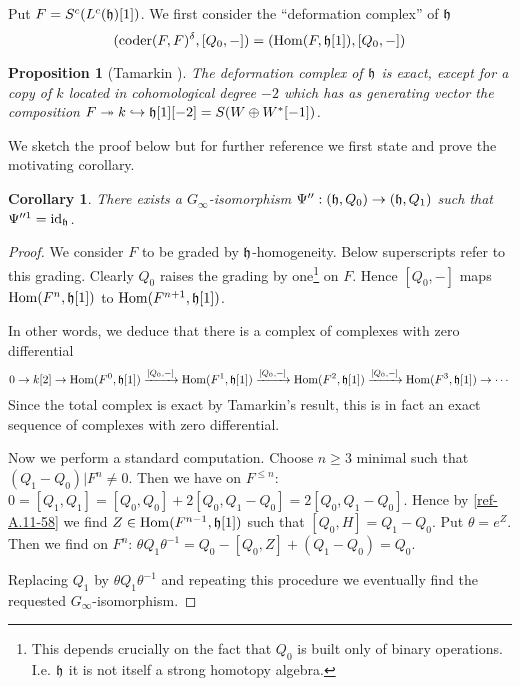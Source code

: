 \documentclass{amsart}
\numberwithin{equation}{section}
\newtheorem{propositions}[lemmas]{Proposition}
\newtheorem{corollarys}[lemmas]{Corollary}
\theoremstyle{definition}
\theoremstyle{remark}
\begin{document}
Put $F=S^c(L^c(\frak{h})[1])$. 
We first consider the ``deformation complex'' of $\frak{h}$
\begin{equation}
\label{ref-A.10-55}
({\operatorname{coder}}(F,F)^\delta,[Q_0,-])= ({\operatorname {Hom}}(F,\frak{h}[1]),[Q_0,-])
\end{equation}
\begin{propositions}[Tamarkin \cite{Tamarkin}] \label{ref-A.4.1-56}
  The deformation complex of $\frak{h}$ is exact, except for a copy of $k$
  located in cohomological degree $-2$ which has as generating vector the
  composition $F\twoheadrightarrow k\hookrightarrow \frak{h}[1][-2]=S(W\oplus W^\ast[-1])$.
\end{propositions}
We sketch the proof below but for further reference we first 
state and prove the motivating corollary.
\begin{corollarys}
\label{ref-A.4.2-57}
There exists a $G_\infty$-isomorphism
$\Psi'':(\frak{h},Q_0)\rightarrow (\frak{h},Q_1)$ such that $\Psi^{\prime
  \prime 1}={\operatorname{id}}_{\frak{h}}$.
\end{corollarys}
\begin{proof}
We consider $F$ to be graded by 
$\frak{h}$-homogeneity. Below superscripts refer to this grading. 
Clearly $Q_0$ raises the grading by one\footnote{This depends crucially
on the fact that $Q_0$ is built only of binary operations. I.e. $\frak{h}$ it is not itself a strong homotopy algebra.} on $F$.  Hence $[Q_0,-]$ maps
${\operatorname {Hom}}(F^n,\frak{h}[1])$ to ${\operatorname {Hom}}(F^{n+1},\frak{h}[1])$. 

In other words, we deduce that there is a complex of complexes
 with zero differential
\begin{equation}
\label{ref-A.11-58}
0\rightarrow k[2]\rightarrow {\operatorname {Hom}}(F^0,\frak{h}[1])\xrightarrow{[Q_0,-]} {\operatorname {Hom}}(F^1,\frak{h}[1])
\xrightarrow{[Q_0,-]}{\operatorname {Hom}}(F^2,\frak{h}[1])\xrightarrow{[Q_0,-]} 
{\operatorname {Hom}}(F^3,\frak{h}[1])\rightarrow \cdots
\end{equation}
Since the total complex is exact by Tamarkin's result, this is in fact an
exact sequence of complexes with zero differential. 

\medskip

Now we perform a standard computation.  Choose $n\ge 3$ minimal such
that $(Q_1-Q_0)|F^{n}\neq 0$. Then we have on $F^{\le n}$:
$0=[Q_1,Q_1]=[Q_0,Q_0]+2[Q_0,Q_1-Q_0]=2[Q_0,Q_1-Q_0]$. Hence by
\eqref{ref-A.11-58} we find $Z\in {\operatorname {Hom}}(F^{n-1},\frak{h}[1])$ such that
$[Q_0,H]=Q_1-Q_0$. Put $\theta=e^Z$. Then we find on $F^n$: $\theta
Q_1\theta^{-1}=Q_0-[Q_0,Z]+(Q_1-Q_0)=Q_0$.

Replacing $Q_1$ by $\theta Q_1\theta^{-1}$ and repeating this procedure
we eventually find the requested $G_\infty$-isomorphism. 
\end{proof}
\end{document}

